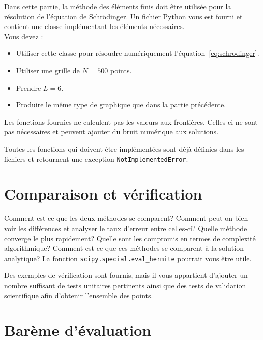 \documentclass[12pt, letterpaper]{article}
\begin{document}
\noindent Dans cette partie, la méthode des éléments finis doit être utilisée pour la résolution de l'équation de Schrödinger.
Un fichier Python vous est fourni et contient une classe implémentant les éléments nécessaires. \\

\noindent Vous devez :

\begin{itemize}
	\item Utiliser cette classe pour résoudre numériquement l’équation~\ref{eq:schrodinger}.
	\item Utiliser une grille de $N=500$ points.
	\item Prendre $L=6$.
	\item Produire le même type de graphique que dans la partie précédente.
\end{itemize}

\noindent Les fonctions fournies ne calculent pas les valeurs aux frontières.
Celles-ci ne sont pas nécessaires et peuvent ajouter du bruit numérique aux solutions.

\begin{tcolorbox}
	Toutes les fonctions qui doivent être implémentées sont déjà définies dans les fichiers
	et retournent une exception \texttt{NotImplementedError}.
\end{tcolorbox}

\section{Comparaison et vérification}\label{sec:verification}

Comment est-ce que les deux méthodes se comparent?
Comment peut-on bien voir les différences et analyser le taux d'erreur entre celles-ci?
Quelle méthode converge le plus rapidement?
Quelle sont les compromis en termes de complexité algorithmique?
Comment est-ce que ces méthodes se comparent à la solution analytique?
La fonction \texttt{scipy.special.eval\_hermite} pourrait vous être utile.
\begin{tcolorbox}[]
	Des exemples de vérification sont fournis, mais il vous appartient d’ajouter un nombre suffisant de tests unitaires pertinents ainsi que des tests de validation scientifique afin d’obtenir l’ensemble des points.
\end{tcolorbox}

\section{Barème d'évaluation}\label{sec:bareme-evaluation}
\end{document}
